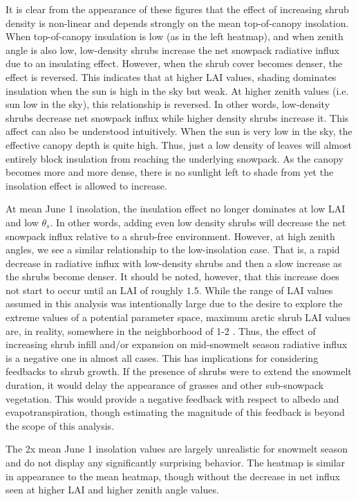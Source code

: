 \documentclass[
10pt, %
letterpaper, %
oneside, %
headinclude,footinclude, %
BCOR5mm, %
]{scrartcl}
\begin{document}
It is clear from the appearance of these figures that the effect of increasing shrub density is non-linear and depends strongly on the mean top-of-canopy insolation. When top-of-canopy insulation is low (as in the left heatmap), and when zenith angle is also low, low-density shrubs increase the net snowpack radiative influx due to an insulating effect. However, when the shrub cover becomes denser, the effect is reversed. This indicates that at higher LAI values, shading dominates insulation when the sun is high in the sky but weak. At higher zenith values (i.e. sun low in the sky), this relationship is reversed. In other words, low-density shrubs decrease net snowpack influx while higher density shrubs increase it. This affect can also be understood intuitively. When the sun is very low in the sky, the effective canopy depth is quite high. Thus, just a low density of leaves will almost entirely block insulation from reaching the underlying snowpack. As the canopy becomes more and more dense, there is no sunlight left to shade from yet the insolation effect is allowed to increase.

At mean June 1 insolation, the insulation effect no longer dominates at low LAI and low $\theta_s$. In other words, adding even low density shrubs will decrease the net snowpack influx relative to a shrub-free environment. However, at high zenith angles, we see a similar relationship to the low-insolation case. That is, a rapid decrease in radiative influx with low-density shrubs and then a slow increase as the shrubs become denser. It should be noted, however, that this increase does not start to occur until an LAI of roughly $1.5$. While the range of LAI values assumed in this analysis was intentionally large due to the desire to explore the extreme values of a potential parameter space, maximum arctic shrub LAI values are, in reality, somewhere in the neighborhood of 1-2 \cite{chen_relating_2009}. Thus, the effect of increasing shrub infill and/or expansion on mid-snowmelt season radiative influx is a negative one in almost all cases. This has implications for considering feedbacks to shrub growth. If the presence of shrubs were to extend the snowmelt duration, it would delay the appearance of grasses and other sub-snowpack vegetation. This would provide a negative feedback with respect to albedo and evapotranspiration, though estimating the magnitude of this feedback is beyond the scope of this analysis.

The 2x mean June 1 insolation values are largely unrealistic for snowmelt season and do not display any significantly surprising behavior. The heatmap is similar in appearance to the mean heatmap, though without the decrease in net influx seen at higher LAI and higher zenith angle values.
\end{document}
